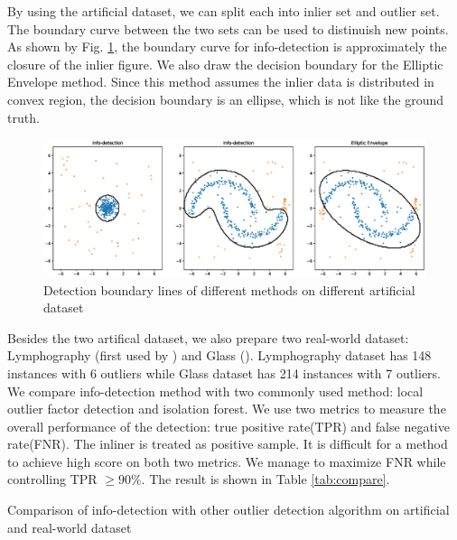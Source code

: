 \documentclass[runningheads]{llncs}
\begin{document}
By using the artificial dataset, we can split each into inlier set and outlier set. The boundary curve between the two sets can be used to distinuish new points. As shown by Fig. \ref{fig:boundary}, the boundary curve for info-detection is approximately the closure of the inlier figure. We also draw the decision boundary for the Elliptic Envelope method. Since this method assumes the inlier data is distributed in convex region, the decision boundary is an ellipse, which is not like the ground truth.
\begin{figure}[!ht]
	\centering
	\includegraphics[width=\textwidth]{pic/outlier_boundary_illustration.eps}
	\caption{Detection boundary lines of different methods on different artificial dataset}	\label{fig:boundary}
\end{figure}

Besides the two artifical dataset, we also prepare two real-world dataset: Lymphography (first used by \cite{Lazarevic}) and Glass (\cite{hics}). Lymphography dataset has 148 instances with 6 outliers while Glass dataset has 214 instances with 7 outliers. We compare info-detection method with two commonly used method: local outlier factor detection and isolation forest. We use two metrics to measure the overall performance of the detection: true positive rate(TPR) and false negative rate(FNR). The inliner is treated as positive sample. It is difficult for a method to achieve high score on both two metrics. We manage to maximize FNR while controlling TPR $\geq 90\%$. The result is shown in Table \ref{tab:compare}.
\begin{table}[!ht]
\centering
{}
\caption{Comparison of info-detection with other outlier detection algorithm on artificial and real-world dataset}\label{tab:compare}
\end{table}
%
%
%


%
\appendix
\end{document}
